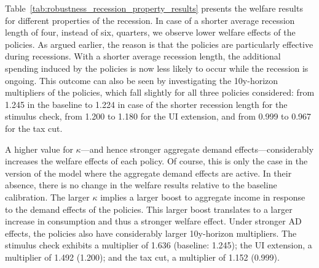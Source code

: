 \documentclass[\latexroot/\projectname]{subfiles}
\begin{document}
Table~\ref{tab:robustness_recession_property_results} presents the welfare results for different properties of the recession.
In case of a shorter average recession length of four, instead of six, quarters, we observe lower welfare effects of the policies.
As argued earlier, the reason is that the policies are particularly effective during recessions.
With a shorter average recession length, the additional spending induced by the policies is now less likely to occur while the recession is ongoing.
This outcome can also be seen by investigating the 10y-horizon multipliers of the policies, which fall slightly for all three policies considered: from 1.245 in the baseline to 1.224 in case of the shorter recession length for the stimulus check, from 1.200 to 1.180 for the UI extension, and from 0.999 to 0.967 for the tax cut.

A higher value for $\kappa$---and hence stronger aggregate demand effects---considerably increases the welfare effects of each policy.
Of course, this is only the case in the version of the model where the aggregate demand effects are active.
In their absence, there is no change in the welfare results relative to the baseline calibration.
The larger $\kappa$ implies a larger boost to aggregate income in response to the demand effects of the policies.
This larger boost translates to a larger increase in consumption and thus a stronger welfare effect.
Under stronger AD effects, the policies also have considerably larger 10y-horizon multipliers.
The stimulus check exhibits a multiplier of 1.636 (baseline: 1.245); the UI extension, a multiplier of 1.492 (1.200); and the tax cut, a multiplier of 1.152 (0.999).
\end{document}
